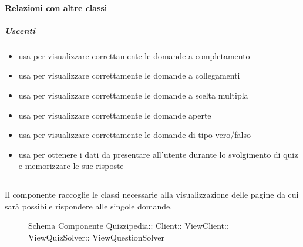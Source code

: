 \paragraph{Relazioni con altre classi}
\subparagraph{Uscenti}
\begin{itemize}
\item usa  per visualizzare correttamente le domande a completamento
\item usa  per visualizzare correttamente le domande a collegamenti
\item usa  per visualizzare correttamente le domande a scelta multipla
\item usa  per visualizzare correttamente le domande aperte
\item usa  per visualizzare correttamente le domande di tipo vero/falso
\item usa  per ottenere i dati da presentare all'utente durante lo svolgimento di quiz e memorizzare le sue risposte
\end{itemize}
\subsection{}
Il componente raccoglie le classi necessarie alla visualizzazione delle pagine da cui sarà possibile rispondere alle singole domande.
\begin{figure}[H]
\centering
\noindent{}
\caption[Schema Componente ViewQuestionSolver]{Schema Componente Quizzipedia:: Client:: ViewClient:: ViewQuizSolver:: ViewQuestionSolver}
\end{figure}
